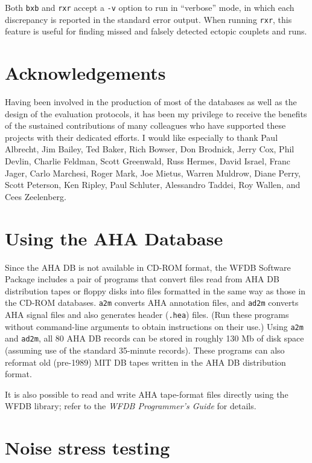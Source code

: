 Both {\tt bxb} and {\tt rxr} accept a {\tt -v} option to run in
``verbose'' mode, in which each discrepancy is reported in the
standard error output.  When running {\tt rxr}, this feature is useful
for finding missed and falsely detected ectopic couplets and runs.

\section{Acknowledgements}

Having been involved in the production of most of the databases as
well as the design of the evaluation protocols, it has been my
privilege to receive the benefits of the sustained contributions of
many colleagues who have supported these projects with their dedicated
efforts.  I would like especially to thank
Paul Albrecht,
Jim Bailey,
Ted Baker,
Rich Bowser,
Don Brodnick,
Jerry Cox,
Phil Devlin,
Charlie Feldman,
Scott Greenwald,
Russ Hermes,
David Israel,
Franc Jager,
Carlo Marchesi,
Roger Mark,
Joe Mietus,
Warren Muldrow,
Diane Perry,
Scott Peterson,
Ken Ripley,
Paul Schluter,
Alessandro Taddei,
Roy Wallen,
and Cees Zeelenberg.

\appendix
\section{Using the AHA Database}

Since the AHA DB is not available in CD-ROM format, the WFDB Software
Package includes a pair of programs that convert files read from AHA
DB distribution tapes or floppy disks into files formatted in the same
way as those in the CD-ROM databases.  {\tt a2m} converts AHA
annotation files, and {\tt ad2m} converts AHA signal files and also
generates header ({\tt *.hea}) files.  (Run these programs without
command-line arguments to obtain instructions on their use.)  Using
{\tt a2m} and {\tt ad2m}, all 80 AHA DB records can be stored in
roughly 130 Mb of disk space (assuming use of the standard 35-minute
records).  These programs can also reformat old (pre-1989) MIT DB
tapes written in the AHA DB distribution format.

It is also possible to read and write AHA tape-format files directly using
the WFDB library;  refer to the {\it WFDB Programmer's Guide}
for details.

\section{Noise stress testing}

